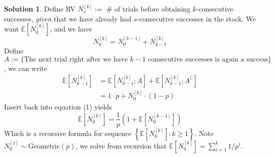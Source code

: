 \documentclass[a4paper, 10pt]{article}
\theoremstyle{definition}
\theoremstyle{hSol}
\newtheorem*{solution}{Solution}
\begin{document}
\begin{solution} Define RV $N^{[k]}_s:=$ \# of trials before obtaining $k$-consecutive successes, \textit{given} that we have already had $s$-consecutive successes in the stack. We want $\mathbb{E}\left[N^{[k]}_0\right]$, and we have
\begin{equation}
  N_0^{[k]} = N_0^{[k-1]} + N_{k-1}^{[k]}
\end{equation}
Define $A:=\{\text{The next trial right after we have $k-1$ consecutive successes is again a success}\}$, we can write
\begin{equation}
  \begin{split}
    \mathbb{E}\left[N_{k-1}^{[k]}\right] & = \mathbb{E}\left[N_{k-1}^{[k]}; A\right] + \mathbb{E}\left[N_{k-1}^{[k]}; A^{\complement}\right]\\
    & = 1\cdot p + N_0^{[k]} \cdot (1-p)
  \end{split}
\end{equation}
Insert back into equation (1) yields
\begin{equation}
  \mathbb{E}\left[N_0^{[k]}\right] = \frac{1}{p}\left(1+\mathbb{E}\left[N_0^{[k-1]}\right]\right)
\end{equation}
Which is a recursive formula for sequence $\left\{\mathbb{E}\left[N_0^{[k]}\right]: k\geq 1\right\}$. Note $N_0^{[1]}\sim \text{Geometric} (p)$, we solve from recursion that $\mathbb{E}\left[N_0^{[k]}\right]=\sum_{i=1}^k 1/p^i$.
\end{solution}
\end{document}
